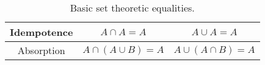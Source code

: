 \begin{table}[hbt]
\begin{center}
\begin{tabular}{c|c|c}
\begin{minipage}{.25\textwidth} \rule{0pt}{22pt}Idempotence\rule[-10pt]{0pt}{10pt} \end{minipage} & 
\begin{minipage}{.35\textwidth} \centerline{$A \cap A = A$} \end{minipage} & 
\begin{minipage}{.35\textwidth} \centerline{$A \cup A = A$} \end{minipage} \\ \hline
\begin{minipage}{.25\textwidth} \rule{0pt}{22pt}Absorption\rule[-10pt]{0pt}{10pt} \end{minipage} & 
\begin{minipage}{.35\textwidth} \centerline{$A \cap (A \cup B) = A$} \end{minipage} & 
\begin{minipage}{.35\textwidth} \centerline{$A \cup (A \cap B) = A$} \end{minipage} \\
\end{tabular} 
\end{center} 
\caption{Basic set theoretic equalities.}
\label{tab:set_equiv}
\end{table}


